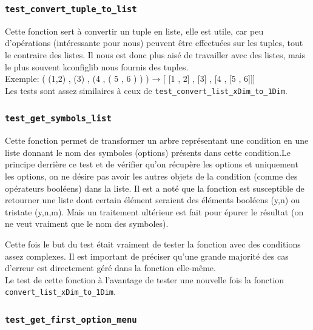 \documentclass[16pts]{report}
\begin{document}
\subsubsection{\texttt{test\_convert\_tuple\_to\_list}}

Cette fonction sert à convertir un tuple en liste, elle est utile, car peu
d'opérations (intéressante pour nous) peuvent être effectuées sur les tuples, tout le contraire des 
listes. Il nous est donc plus aisé de travailler avec des listes, mais le 
plus souvent kconfiglib nous fournis des tuples. \\

Exemple: ( (1,2) , (3) , (4 , ( 5 , 6 ) ) ) → [ [1 , 2] , [3] , [4 , [5 , 6]]] 
\\

Les tests sont assez similaires à ceux de \verb|test_convert_list_xDim_to_1Dim|. \\


\subsubsection{\texttt{test\_get\_symbols\_list}}

Cette fonction permet de transformer un arbre représentant une condition
en une liste donnant le nom des symboles (options) présents dans cette 
condition.Le principe derrière ce test et de vérifier qu'on récupère les 
options et uniquement les options, on ne désire pas avoir les autres objets 
de la condition (comme des opérateurs booléens) dans la liste.
Il est a noté que la fonction est susceptible de retourner une liste dont 
certain élément seraient des éléments booléens (y,n) ou tristate (y,n,m). 
Mais un traitement ultérieur est fait pour épurer le résultat (on ne 
veut vraiment que le nom des symboles).

Cette fois le but du test était vraiment de tester la fonction avec des 
conditions assez complexes. Il est important de préciser qu'une grande 
majorité des cas d'erreur est directement géré dans la fonction elle-même.\\

Le test de cette fonction à l'avantage de tester une nouvelle fois la 
fonction \verb|convert_list_xDim_to_1Dim|.\\

\subsubsection{\texttt{test\_get\_first\_option\_menu}}
\end{document}
